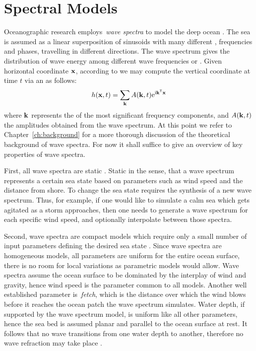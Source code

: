 \section{Spectral Models}
%
Oceanographic research employs~\emph{wave spectra} to model the deep ocean
\citep{book:kinsman2002wind}. The sea is assumed as a linear superposition of
sinusoids with many different \wavelengths, frequencies and phases, travelling
in different directions. The wave spectrum gives the distribution of wave energy
among different wave frequencies or \wavelengths.
Given horizontal coordinate $\mathbf{x}$, according to
\citet{course:simulatingocean} we may compute the vertical coordinate
at time $t$ via an \InvDiscreteFourierTransform as follows:
\begin{equation}
h(\mathbf{x},t) = \sum_{\mathbf{k}}A(\mathbf{k},t)\mathrm{e}^{\mathrm{i}\mathbf{k}^{\mathsf{T}}\mathbf{x}}
\label{eq:spectral_models}
\end{equation}
where $\mathbf{k}$ represents the \wavevectors of the most significant frequency
components, and $A(\mathbf{k},t)$ the amplitudes obtained from the wave
spectrum.
At this point we refer to Chapter~\ref{ch:background} for a more thorough
discussion of the theoretical background of wave spectra.
For now it shall suffice to give an overview of key properties of wave spectra. 

First, all wave spectra are static \citep{book:kinsman2002wind}.
Static in the sense, that a wave spectrum represents a certain sea
state based on parameters such as wind speed and the distance from shore. To
change the sea state requires the synthesis of a new wave spectrum. Thus, for
example, if one would like to simulate a calm sea which gets agitated as a storm
approaches, then one needs to generate a wave spectrum for each specific wind
speed, and optionally interpolate between those spectra.

Second, wave spectra are compact models which require only a small
number of input parameters defining the desired sea state
\citep{book:windgeneratedoceanwaves, book:kinsman2002wind}.
Since wave spectra
are homogeneous models, all parameters are uniform for the entire ocean surface,
there is no room for local variations as parametric models would allow. Wave
spectra assume the ocean surface to be dominated by the interplay of wind and
gravity, hence wind speed is the parameter common to all models. Another well
established parameter is~\emph{fetch}, which is the distance over which the wind
blows before it reaches the ocean patch the wave spectrum simulates. Water
depth, if supported by the wave spectrum model, is uniform like all other
parameters, hence the sea bed is assumed planar and parallel to the ocean surface
at rest. It follows that no wave transitions from one water depth to another,
therefore no wave refraction may take place \citep{book:mei1989}.

